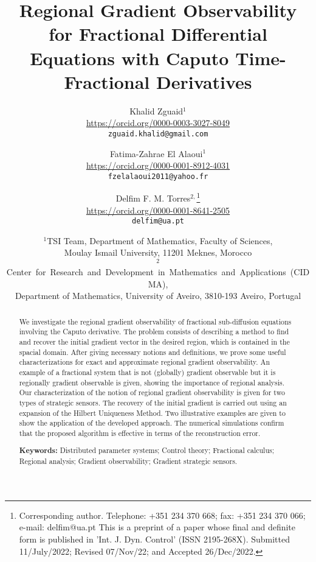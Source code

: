 \documentclass{article}
\begin{document}
\title{Regional Gradient Observability for Fractional Differential Equations with Caputo Time-Fractional Derivatives}

\author{Khalid Zguaid$^{1}$\\ 
\url{https://orcid.org/0000-0003-3027-8049}\\
\texttt{zguaid.khalid@gmail.com} 
\and Fatima-Zahrae El Alaoui$^{1}$\\ 
\url{https://orcid.org/0000-0001-8912-4031}\\
\texttt{fzelalaoui2011@yahoo.fr}
\and Delfim F. M. Torres$^{2,}$\thanks{Corresponding author.
Telephone: +351 234 370 668; fax: +351 234 370 066; e-mail: delfim@ua.pt\newline
This is a preprint of a paper whose final and definite form is published 
in 'Int. J. Dyn. Control' (ISSN 2195-268X).\newline 
Submitted 11/July/2022; Revised 07/Nov/22; and Accepted 26/Dec/2022.}\\ 
\url{https://orcid.org/0000-0001-8641-2505}\\
\texttt{delfim@ua.pt}}

\date{$^{1}$TSI Team, Department of Mathematics, Faculty of Sciences,\\
Moulay Ismail University, 11201 Meknes, Morocco\\[0.3cm]
$^{2}$\mbox{Center for Research and Development in Mathematics and Applications (CIDMA),}\\
Department of Mathematics, University of Aveiro, 3810-193 Aveiro, Portugal}
  	
\maketitle


\begin{abstract}
We investigate the regional gradient observability
of fractional sub-diffusion equations involving the Caputo derivative. 
The problem consists of describing a method to find and recover 
the initial gradient vector in the desired region, which 
is contained in the spacial domain. After giving necessary 
notions and definitions, we prove some useful characterizations 
for exact and approximate regional gradient observability. 
An example of a fractional system that is not (globally) 
gradient observable but it is regionally 
gradient observable is given, showing
the importance of regional analysis.
Our characterization of the notion of regional gradient observability
is given for two types of strategic sensors. 
The recovery of the initial gradient is carried out
using an expansion of the Hilbert Uniqueness Method. Two illustrative
examples are given to show the application of the developed approach. 
The numerical simulations confirm that the proposed algorithm is
effective in terms of the reconstruction error.   

\medskip

\noindent \textbf{Keywords:} Distributed parameter systems; Control theory;
Fractional calculus; Regional analysis; 
Gradient observability; Gradient strategic sensors.
\end{abstract}
\end{document}
